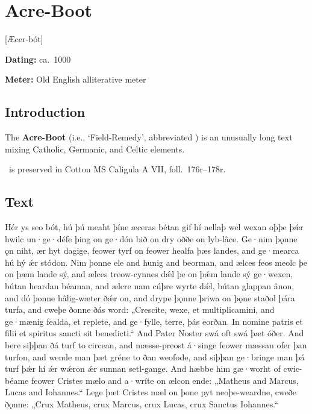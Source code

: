 \section{Acre-Boot}[Æcer-bót]\chapterStart{}%

\begin{flushright}%
\textbf{Dating:} ca.~1000 \ce

\textbf{Meter:} Old English alliterative meter%
\end{flushright}%

\subsection{Introduction}

The \textbf{Acre-Boot} (i.e., ‘Field-Remedy’, abbreviated \Acerbot) is an unusually long text mixing Catholic, Germanic, and Celtic elements.

\Acerbot\ is preserved in Cotton MS Caligula A VII, foll.~176r--178r.

\sectionline

\subsection{Text}

\bpg\bpa Hér ys seo bót, hú þú meaht þíne æceras bétan gif hí nellaþ wel wexan oþþe þǽr hwilc un·ge·défe þing on ge·dón bið on dry oððe on lyb-lâce. Ge·nim þǫnne ǫn niht, ær hyt dagige, feower tyrf on feower healfa þæs landes, and ge·mearca hú hý ǽr stódon. Nim þonne ele and hunig and beorman, and ælces feos meolc þe on þæm lande sý, and ælces treow-cynnes dǽl þe on þǽm lande sý ge·wexen, bútan heardan béaman, and ælcre nam cúþre wyrte dǽl, bútan glappan ânon, and dó þonne hâlig-wæter ðǽr on, and drype þǫnne þriwa on þǫne staðol þára turfa, and cweþe ðonne ðás word:
„Crescite, wexe, et multiplicamini, and ge·mænig fealda, et replete, and ge·fylle, terre, þás eorðan.
In nomine patris et filii et spiritus sancti sit benedicti.“
And Pater Noster swá oft swá þæt óðer.  And bere siþþan ðá turf to circean, and mæsse-preost á·singe feower mæssan ofer þan turfon, and wende man þæt gréne to ðan weofode, and siþþan ge·bringe man þá turf þǽr hí ǽr wǽron ǽr sunnan setl-gange.
And hæbbe him gæ·worht of cwic-béame feower Cristes mælo and a·wríte on ælcon ende:
„Matheus and Marcus, Lucas and Iohannes.“
Lege þæt Cristes mæl on þone pyt neoþe-weardne, cweðe ðǫnne:
„Crux Matheus, crux Marcus, crux Lucas, crux Sanctus Iohannes.“\epa

